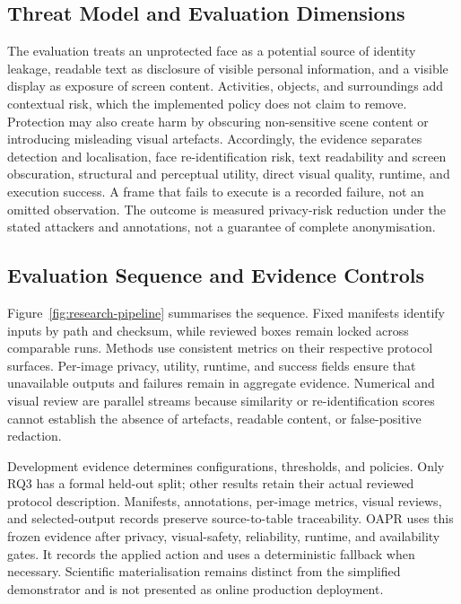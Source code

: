 \documentclass[10pt,twocolumn]{IEEEtran}
\begin{document}
\subsection{Threat Model and Evaluation Dimensions}

The evaluation treats an unprotected face as a potential source of identity leakage,
readable text as disclosure of visible personal information, and a visible
display as exposure of screen content. Activities, objects, and surroundings add
contextual risk, which the implemented policy does not claim to remove. Protection may
also create harm by obscuring non-sensitive scene content or introducing
misleading visual artefacts. Accordingly, the evidence separates detection and
localisation, face re-identification risk, text readability and screen
obscuration, structural and perceptual utility, direct visual quality, runtime,
and execution success. A frame that fails to execute is a recorded failure, not
an omitted observation. The outcome is measured privacy-risk reduction under
the stated attackers and annotations, not a guarantee of complete
anonymisation.

\subsection{Evaluation Sequence and Evidence Controls}

Figure~\ref{fig:research-pipeline} summarises the sequence. Fixed manifests
identify inputs by path and checksum, while reviewed boxes remain locked across
comparable runs. Methods use consistent metrics on their respective protocol
surfaces. Per-image privacy, utility, runtime, and success fields ensure that
unavailable outputs and failures remain in aggregate evidence. Numerical and
visual review are parallel streams because similarity or re-identification
scores cannot establish the absence of artefacts, readable content, or
false-positive redaction.

Development evidence determines configurations, thresholds, and policies. Only
RQ3 has a formal held-out split; other results retain their actual reviewed
protocol description. Manifests, annotations, per-image metrics, visual reviews,
and selected-output records preserve source-to-table traceability. OAPR uses
this frozen evidence after privacy, visual-safety, reliability, runtime, and
availability gates. It records the applied action and uses a deterministic
fallback when necessary. Scientific materialisation remains distinct from the
simplified demonstrator and is not presented as online production deployment.
\end{document}
